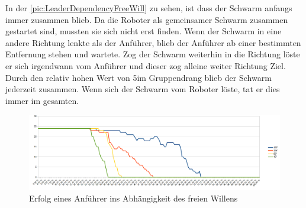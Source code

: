 In der \autoref{pic:LeaderDependencyFreeWill} zu sehen, ist dass der Schwarm anfangs immer zusammen blieb. Da die Roboter als gemeinsamer Schwarm zusammen gestartet sind, mussten sie sich nicht erst finden. Wenn der Schwarm in eine andere Richtung lenkte als der Anführer, blieb der Anführer ab einer bestimmten Entfernung stehen und wartete. Zog der Schwarm weiterhin in die Richtung löste er sich irgendwann vom Anführer und dieser zog alleine weiter Richtung Ziel. Durch den relativ hohen Wert von 5\per im Gruppendrang blieb der Schwarm jederzeit zusammen. Wenn sich der Schwarm vom Roboter löste, tat er dies immer im gesamten.

\begin{figure}
	\includegraphics[width=\textwidth, height=\statisticHeight]{graphics/Statistics/Leader/DependencyFreeWill.png}
	\caption{Erfolg eines Anführer ins Abhängigkeit des freien Willens}
	\label{pic:LeaderDependencyFreeWill}
\end{figure}

